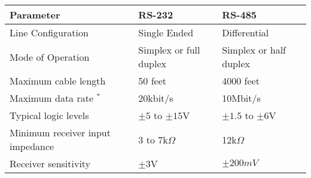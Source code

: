 \begin{table}[H]
    \begin{center}
        \begin{tabular} { | l | l | l | }
        \hline
        Parameter & RS-232 & RS-485\\
        \hline
        Line Configuration & Single Ended & Differential\\
        Mode of Operation & Simplex or full duplex & Simplex or half duplex\\
        Maximum cable length & 50 feet & 4000 feet\\
        Maximum data rate $^*$ & 20kbit/s & 10Mbit/s\\
        Typical logic levels & $\pm 5$ to $\pm 15$V & $\pm 1.5$ to $\pm 6$V\\
        Minimum receiver input impedance & 3 to 7k$\Omega$ & 12k$\Omega$\\
        Receiver sensitivity & $\pm 3$V & $\pm 200mV$\\
        \hline 
        \end{tabular}
    \end{center}
\end{table}
